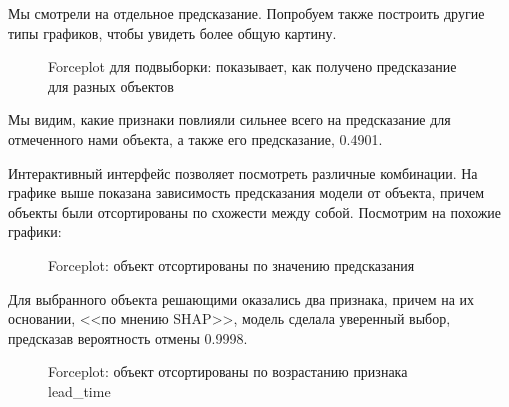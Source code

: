Мы смотрели на отдельное предсказание. Попробуем также построить другие типы графиков, чтобы увидеть более общую картину.

\vspace{-1mm}
\begin{figure}[h]
	\caption*{Forceplot для подвыборки: показывает, как получено предсказание для разных объектов}
\end{figure}
\vspace{-4mm}

Мы видим, какие признаки повлияли сильнее всего на предсказание для отмеченного нами объекта, а также его предсказание, 0.4901.

Интерактивный интерфейс позволяет посмотреть различные комбинации. На графике выше показана зависимость предсказания модели от объекта, причем объекты были отсортированы по схожести между собой. Посмотрим на похожие графики:

\vspace{-1mm}
\begin{figure}[h]
	\caption*{Forceplot: объект отсортированы по значению предсказания}
\end{figure}
\vspace{-4mm}

Для выбранного объекта решающими оказались два признака, причем на их основании, <<по мнению SHAP>>, модель сделала уверенный выбор, предсказав вероятность отмены 0.9998.

\vspace{-1mm}
\begin{figure}[h]
	\caption*{Forceplot: объект отсортированы по возрастанию признака lead\_time}
\end{figure}
\vspace{-4mm}

